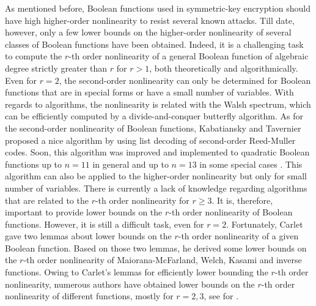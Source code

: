 \documentclass{article}
\newcommand{\0}{\textbf{0}}
\newcommand{\1}{\textbf{1}}
\theoremstyle{plain}
\begin{document}
    As mentioned before, Boolean functions used in symmetric-key encryption should have high higher-order nonlinearity to resist several known attacks.
    Till date, however, only a few lower bounds on the higher-order nonlinearity of several classes of Boolean functions have been obtained.
    Indeed, it is a challenging task to compute the $r$-th order nonlinearity of a general Boolean function of algebraic degree strictly greater than $r$ for $r>1$,
    both theoretically and algorithmically.
    Even for $r=2$,
    the second-order nonlinearity can only be determined for Boolean functions that are in special forms or have a small number of variables.
    With regards to algorithms, the nonlinearity is related with the Walsh spectrum, which can be efficiently computed by a divide-and-conquer butterfly algorithm.
    As for the second-order nonlinearity of Boolean functions, Kabatiansky and Tavernier \cite{KabatianskyT2005listdecoding_RM_2_n} proposed a nice algorithm by using list decoding of second-order Reed-Muller codes.
    Soon, this algorithm was improved and implemented to quadratic Boolean functions up to $n=11$ in general and up to $n=13$ in some special cases \cite{FourquetT2008improved_listdecoding_RM_2_n}.
    This algorithm can also be applied to the higher-order nonlinearity but only for small number of variables.
    There is currently a lack of knowledge regarding algorithms that are related to the $r$-th order nonlinearity for $r\ge 3$.
    It is, therefore, important to provide lower bounds on the $r$-th order nonlinearity of Boolean functions.
    However, it is still a difficult task, even for $r=2$.
    Fortunately, Carlet \cite{Carlet2008lowbound_NL_profile} gave two lemmas about lower bounds on the $r$-th order nonlinearity of a given Boolean function.
    Based on those two lemmas, he derived some lower bounds on the $r$-th order nonlinearity of Maiorana-McFarland, Welch, Kasami and inverse functions.
    Owing to Carlet's lemmas for efficiently lower bounding the $r$-th order nonlinearity, numerous authors have obtained lower bounds on
    the $r$-th order nonlinearity of different functions, mostly for $r=2,3$, see for \cite{Carlet2011NL_Profile_Dillon,YanT2020NL_2,Liu2023NL_2,TangYZZ2020NL_2bent,SihemKJ2020NL_2cubic,SunW2009NL_2,SarkarG2009NL_2MM,GangopadhyayST2010NL_2,SunW2011NL_2,GaoT2017NL_2_MM,TangCT2013NL_2bent,GodeG2010NL_3Kasami,Singh2014NL_3_biquadratic}.
\end{document}
